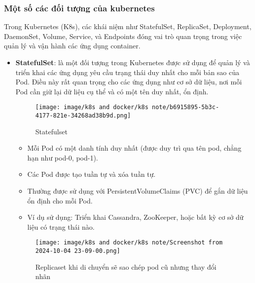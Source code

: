 \documentclass[a4paper,12pt]{article}
\begin{document}
\subsubsection{ Một số các đối tượng của kubernetes}
Trong Kubernetes (K8s), các khái niệm như StatefulSet, ReplicaSet, Deployment, DaemonSet, Volume, Service, và Endpoints đóng vai trò quan trọng trong việc quản lý và vận hành các ứng dụng container. 
\begin{itemize}
\begin{figure}[htbp]
    \centering
    \texttt{[image: image/k8s and docker/k8s note/Screenshot from 2024-10-04 23-08-49.png]}
    \caption{Statefulset khi di chuyển pod sẽ sao chép y nguyên pod cũ đi}
    \label{}
\end{figure}
    \item \textbf{StatefulSet}: là một đối tượng trong Kubernetes được sử dụng để quản lý và triển khai các ứng dụng yêu cầu trạng thái duy nhất cho mỗi bản sao của Pod. Điều này rất quan trọng cho các ứng dụng như cơ sở dữ liệu, nơi mỗi Pod cần giữ lại dữ liệu cụ thể và có một tên duy nhất, ổn định. 

\begin{figure}[htbp]
    \centering
    \texttt{[image: image/k8s and docker/k8s note/b6915895-5b3c-4177-821e-34268ad38b9d.png]}
    \caption{Statefulset}
    \label{}
\end{figure}


    \begin{itemize}
        \item Mỗi Pod có một danh tính duy nhất (được duy trì qua tên pod, chẳng hạn như pod-0, pod-1).
        \item Các Pod được tạo tuần tự và xóa tuần tự.
        \item Thường được sử dụng với PersistentVolumeClaims (PVC) để gắn dữ liệu ổn định cho mỗi Pod.
        \item Ví dụ sử dụng: Triển khai Cassandra, ZooKeeper, hoặc bất kỳ cơ sở dữ liệu có trạng thái nào.
    \end{itemize}

\begin{figure}[htbp]
    \centering
    \texttt{[image: image/k8s and docker/k8s note/Screenshot from 2024-10-04 23-09-00.png]}
    \caption{Replicaset khi di chuyển sẽ sao chép pod cũ nhưng thay đổi nhãn}
    \label{}
\end{figure}
    

\end{itemize}
\end{document}
